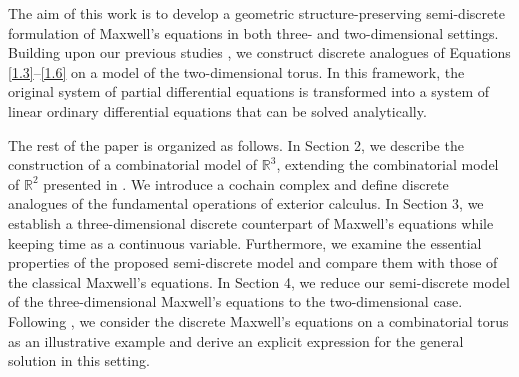 \documentclass[english]{article}
\theoremstyle{plain}
\theoremstyle{definition}
\theoremstyle{remark}
\numberwithin{equation}{section}
\begin{document}
The aim of this work is to develop a geometric structure-preserving semi-discrete formulation of Maxwell’s equations in both three- and two-dimensional settings. Building upon our previous studies \cite{S5, S6}, we construct discrete analogues of Equations \eqref{1.3}–\eqref{1.6} on a model of the two-dimensional torus. In this framework, the original system of partial differential equations is transformed into a system of linear ordinary differential equations that can be solved analytically.


The rest of the paper is organized as follows. In Section 2, we describe the construction of a combinatorial model of
$\mathbb{R}^3$, extending the combinatorial model of $\mathbb{R}^2$  presented in \cite{S5}. We introduce a cochain complex and define discrete analogues of the fundamental operations of exterior calculus. In Section 3, we establish a three-dimensional discrete counterpart of Maxwell’s equations while keeping time as a continuous variable. Furthermore, we examine the essential properties of the proposed semi-discrete model and compare them with those of the classical Maxwell’s equations. In Section 4, we reduce our semi-discrete model of the three-dimensional Maxwell’s equations to the two-dimensional case. Following \cite{S5, S6}, we consider the discrete Maxwell's equations on a combinatorial torus as an illustrative example and derive an explicit expression for the general solution in this setting.
\end{document}
